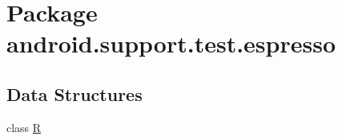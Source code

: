 \hypertarget{namespaceandroid_1_1support_1_1test_1_1espresso}{}\section{Package android.\+support.\+test.\+espresso}
\label{namespaceandroid_1_1support_1_1test_1_1espresso}
\subsection*{Data Structures}
\begin{DoxyCompactItemize}
\item 
class \mbox{\hyperlink{classandroid_1_1support_1_1test_1_1espresso_1_1_r}{R}}
\end{DoxyCompactItemize}
